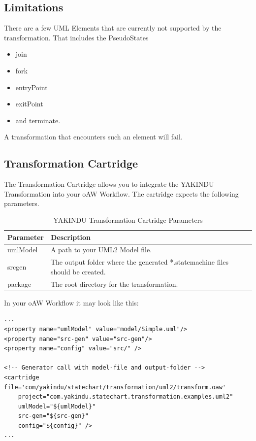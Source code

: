 \subsection{Limitations}
There are a few UML Elements that are currently not supported by the transformation. That includes the
PseudoStates
\begin{itemize}
\item join
\item fork
\item entryPoint
\item exitPoint
\item and terminate.
\end{itemize}
A transformation that encounters such
an element will fail.

\subsection{Transformation Cartridge}
The Transformation Cartridge allows you to integrate the YAKINDU Transformation into
your oAW Workflow. The cartridge expects the following parameters.

\begin{table}[ht]
\begin{center}
\begin{tabular}{|l|l|}
\hline Parameter & Description \\
\hline
umlModel & A path to your UML2 Model file. \\
srcgen &  The output folder where the generated *.statemachine files should be created. \\
package &  The root directory for the transformation. \\
\hline
\end{tabular}
\end{center}
\caption{YAKINDU Transformation Cartridge Parameters}
\label{YAKINDU Transformation Cartridge Parameters}
\end{table}

In your oAW Workflow it may look like this:\begin{verbatim}
...
<property name="umlModel" value="model/Simple.uml"/>
<property name="src-gen" value="src-gen"/>
<property name="config" value="src/" />

<!-- Generator call with model-file and output-folder -->
<cartridge file='com/yakindu/statechart/transformation/uml2/transform.oaw' 
	project="com.yakindu.statechart.transformation.examples.uml2"
 	umlModel="${umlModel}" 
 	src-gen="${src-gen}" 
 	config="${config}" />
...
\end{verbatim} 


